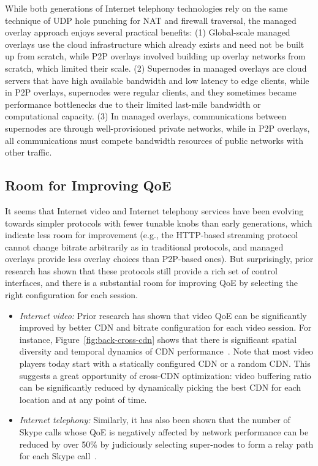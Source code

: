 While both generations of Internet telephony technologies rely on
the same technique of UDP hole punching for NAT and firewall traversal, 
the managed overlay approach enjoys several practical benefits:
(1) Global-scale managed overlays use the cloud infrastructure
which already exists and need not be built up from scratch, while 
P2P overlays involved building up overlay networks from
scratch, which limited their scale.
(2) Supernodes in managed overlays are cloud servers
that have high available bandwidth and low latency to edge clients, 
while in P2P overlays, supernodes were regular clients, 
and they sometimes became performance 
bottlenecks due to their limited last-mile bandwidth or computational capacity.
(3) In managed overlays, communications between supernodes are
through well-provisioned private networks, while in P2P overlays, all 
communications must compete bandwidth resources of public networks with
other traffic.


\subsection{Room for Improving QoE}
\label{subsec:related:back:room}

It seems that Internet video and Internet telephony services 
have been evolving towards simpler protocols with fewer 
tunable knobs than early generations, which indicate less
room for improvement (e.g., the HTTP-based streaming protocol cannot 
change bitrate arbitrarily as in traditional protocols, and 
managed overlays provide less overlay choices than 
P2P-based ones).
But surprisingly, prior research has shown
that these protocols still provide a rich set of control 
interfaces, and there is a substantial room for improving
QoE by selecting the right configuration for each
session.

\begin{itemize}

\item{\em Internet video:} 
Prior research has shown that video QoE can be significantly improved
by better CDN and bitrate configuration for
each video session.
For instance, Figure~\ref{fig:back-cross-cdn} shows that there is 
significant spatial diversity and temporal dynamics of CDN 
performance~\cite{sigcomm12}.
Note that most video players today start with a statically configured 
CDN or a random CDN. This suggests a 
great opportunity of cross-CDN optimization:
video buffering ratio can be significantly reduced by dynamically
picking the best CDN for each location and at any point of time.

\item{\em Internet telephony:}
Similarly, it has also been shown that the number of Skype 
calls whose QoE is negatively affected by network performance
can be reduced by over 50\% by judiciously selecting super-nodes
to form a relay path for each Skype call~\cite{via}.


\end{itemize}

